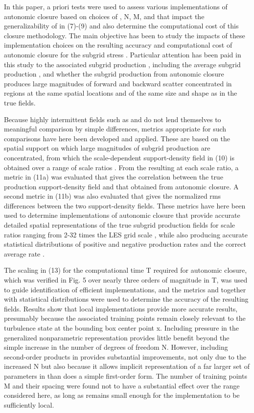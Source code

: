 In this paper, a priori tests were used to assess various implementations of autonomic closure based on choices of  , N, M, and   that impact the generalizability of   in (7)-(9) and also determine the computational cost of this closure methodology. The main objective has been to study the impacts of these implementation choices on the resulting accuracy and computational cost of autonomic closure for the subgrid stress  . Particular attention has been paid in this study to the associated subgrid production  , including the average subgrid production  , and whether the subgrid production   from autonomic closure produces large magnitudes of forward and backward scatter concentrated in regions at the same spatial locations and of the same size and shape as in the true   fields.  

Because highly intermittent fields such as   and   do not lend themselves to meaningful comparison by simple differences, metrics appropriate for such comparisons have here been developed and applied. These are based on the spatial support   on which large magnitudes of subgrid production are concentrated, from which the scale-dependent support-density field   in (10) is obtained over a range of scale ratios  . From the resulting   at each scale ratio, a metric   in (11a) was evaluated that gives the correlation between the true production support-density field and that obtained from autonomic closure. A second metric   in (11b) was also evaluated that gives the normalized rms differences between the two support-density fields. These metrics have here been used to determine implementations of autonomic closure that provide accurate detailed spatial representations of the true subgrid production fields   for scale ratios ranging from 2-32 times the LES grid scale  , while also producing accurate statistical distributions of positive and negative production rates and the correct average rate  .

The scaling in (13) for the computational time T required for autonomic closure, which was verified in Fig. 5 over nearly three orders of magnitude in T, was used to guide identification of efficient implementations, and the metrics   and   together with statistical distributions were used to determine the accuracy of the resulting   fields. Results show that local implementations provide more accurate results, presumably because the associated training points remain closely relevant to the turbulence state at the bounding box center point x. Including pressure in the generalized nonparametric representation   provides little benefit beyond the simple increase in the number of degrees of freedom N. However, including second-order products in   provides substantial improvements, not only due to the increased N but also because it allows implicit representation of a far larger set of parameters in   than does a simple first-order form. The number of training points M and their spacing   were found not to have a substantial effect over the range considered here, as long as   remains small enough for the implementation to be sufficiently local.

